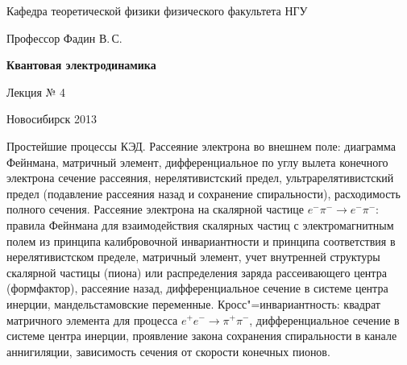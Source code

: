\documentclass[12pt,pagesize,paper=192mm:108mm]{scrbook}
\begin{document}
\begin{titlepage}
\begin{center}
    Кафедра теоретической физики физического факультета НГУ
    \medskip

    \Large
    Профессор Фадин В.\,С.
    \bigskip

    \huge
    \textbf{Квантовая электродинамика}
    \bigskip

    \Large
    Лекция № 4
    \vfill

    \normalsize
    \vfill

    \normalsize \ccbysa\hspace{0.5em}  Новосибирск 2013
  \end{center}
\end{titlepage}
\newpage

\vspace*{-1em}
\begin{center}
\vfill
  \begin{minipage}{0.75\linewidth}
    Простейшие процессы КЭД. Рассеяние электрона во внешнем поле:
    диаграмма Фейнмана, матричный элемент, дифференциальное по углу
    вылета конечного электрона сечение рассеяния, нерелятивистский
    предел, ультрарелятивистский предел (подавление рассеяния назад и
    сохранение спиральности), расходимость полного сечения. Рассеяние
    электрона на скалярной частице $e^-\pi^-\to e^-\pi^-$: правила
    Фейнмана для взаимодействия скалярных частиц с электромагнитным
    полем из принципа калибровочной инвариантности и принципа
    соответствия в нерелятивистском пределе, матричный элемент, учет
    внутренней структуры скалярной частицы (пиона) или распределения
    заряда рассеивающего центра (формфактор), рассеяние назад,
    дифференциальное сечение в системе центра инерции,
    мандельстамовские переменные. Кросс"=инвариантность: квадрат
    матричного элемента для процесса $e^+e^-\to\pi^+\pi^-$,
    дифференциальное сечение в системе центра инерции, проявление
    закона сохранения спиральности в канале аннигиляции, зависимость
    сечения от скорости конечных пионов.
  \end{minipage}
  \vfill

\end{center}
\end{document}
